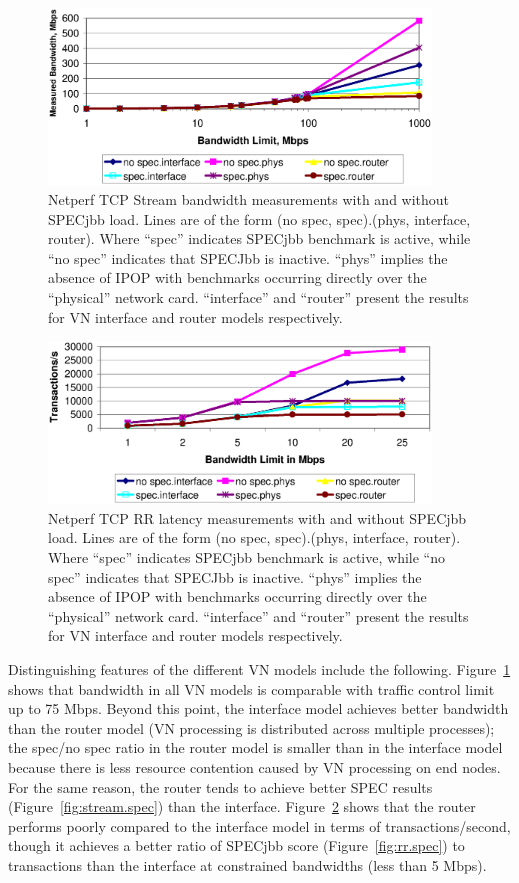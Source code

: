\begin{figure}
\centering
\includegraphics[width=4in]{figs/stream.netperf.jpg.eps}
\caption[Grid Netperf bandwidth evaluation]{Netperf TCP Stream bandwidth
measurements with and without SPECjbb load.  Lines are of the form (no spec,
spec).(phys, interface, router).  Where ``spec'' indicates SPECjbb benchmark is
active, while ``no spec'' indicates that SPECJbb is inactive. ``phys'' implies
the absence of IPOP with benchmarks occurring directly over the ``physical''
network card.  ``interface'' and ``router'' present the results for VN
interface and router models respectively.}
\label{fig:stream.netperf}
\end{figure}

\begin{figure}
\centering
\includegraphics[width=4in]{figs/rr.netperf.jpg.eps}
\caption[Grid Netperf latency evaluation]{Netperf TCP RR latency measurements
with and without SPECjbb load.  Lines are of the form (no spec, spec).(phys,
interface, router).  Where ``spec'' indicates SPECjbb benchmark is active,
while ``no spec'' indicates that SPECJbb is inactive. ``phys'' implies the
absence of IPOP with benchmarks occurring directly over the ``physical''
network card.  ``interface'' and ``router'' present the results for VN
interface and router models respectively.}
\label{fig:rr.netperf}
\end{figure}


Distinguishing features of the different VN models include the following.
Figure~\ref{fig:stream.netperf} shows that bandwidth in all VN models is
comparable with traffic control limit up to 75 Mbps. Beyond this point, the
interface model achieves better bandwidth than the router model (VN processing
is distributed across multiple processes); the spec/no spec ratio in the router
model is smaller than in the interface model because there is less resource
contention caused by VN processing on end nodes. For the same reason, the
router tends to achieve better SPEC results (Figure~\ref{fig:stream.spec}) than
the interface.  Figure~\ref{fig:rr.netperf} shows that the router performs
poorly compared to the interface model in terms of transactions/second, though
it achieves a better ratio of SPECjbb score (Figure~\ref{fig:rr.spec}) to
transactions than the interface at constrained bandwidths (less than 5 Mbps).

